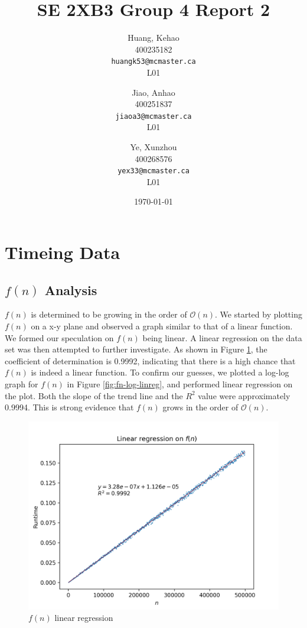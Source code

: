 \documentclass[titlepage, 12pt]{article}
\title{SE 2XB3 Group 4 Report 2}
\author{
  Huang, Kehao \\
  400235182 \\
  \texttt{huangk53@mcmaster.ca} \\
  L01
  \and
  Jiao, Anhao \\
  400251837 \\
  \texttt{jiaoa3@mcmaster.ca} \\
  L01
  \and
  Ye, Xunzhou \\
  400268576 \\
  \texttt{yex33@mcmaster.ca} \\
  L01
}
\date{\today}
\begin{document}
\maketitle{}

\newpage{}

\section{Timeing Data}

\subsection{$f(n)$ Analysis}

$f(n)$ is determined to be growing in the order of $\mathcal{O}(n)$. We started
by plotting $f(n)$ on a x-y plane and observed a graph similar to that of a
linear function. We formed our speculation on $f(n)$ being linear. A linear
regression on the data set was then attempted to further investigate. As shown
in Figure \ref{fig:fn-linreg}, the coefficient of determination is 0.9992,
indicating that there is a high chance that $f(n)$ is indeed a linear function.
To confirm our guesses, we plotted a log-log graph for $f(n)$ in Figure
\ref{fig:fn-log-linreg}, and performed linear regression on the plot. Both the
slope of the trend line and the $R^{2}$ value were approximately 0.9994. This is
strong evidence that $f(n)$ grows in the order of $\mathcal{O}(n)$.
\begin{figure}[H]
    \includegraphics[width=0.8\linewidth]{fn-linreg.png}
    \centering
    \caption{$f(n)$ linear regression}
    \label{fig:fn-linreg} 
\end{figure}
\end{document}
